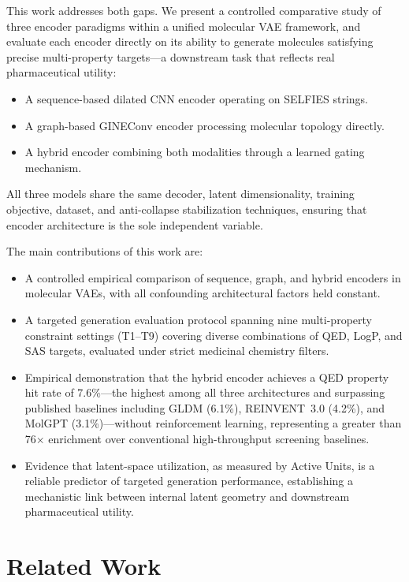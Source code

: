 \documentclass[conference]{IEEEtran}
\begin{document}
This work addresses both gaps. We present a controlled comparative study of three encoder paradigms within a unified molecular VAE framework, and evaluate each encoder directly on its ability to generate molecules satisfying precise multi-property targets---a downstream task that reflects real pharmaceutical utility:

\begin{itemize}
    \item A sequence-based dilated CNN encoder operating on SELFIES strings.
    \item A graph-based GINEConv encoder processing molecular topology directly.
    \item A hybrid encoder combining both modalities through a learned gating mechanism.
\end{itemize}

All three models share the same decoder, latent dimensionality, training objective, dataset, and anti-collapse stabilization techniques, ensuring that encoder architecture is the sole independent variable.

The main contributions of this work are:

\begin{itemize}
    \item A controlled empirical comparison of sequence, graph, and hybrid encoders in molecular VAEs, with all confounding architectural factors held constant.
    \item A targeted generation evaluation protocol spanning nine multi-property constraint settings (T1--T9) covering diverse combinations of QED, LogP, and SAS targets, evaluated under strict medicinal chemistry filters.
    \item Empirical demonstration that the hybrid encoder achieves a QED property hit rate of 7.6\%---the highest among all three architectures and surpassing published baselines including GLDM (6.1\%), REINVENT~3.0 (4.2\%), and MolGPT (3.1\%)---without reinforcement learning, representing a greater than 76$\times$ enrichment over conventional high-throughput screening baselines.
    \item Evidence that latent-space utilization, as measured by Active Units, is a reliable predictor of targeted generation performance, establishing a mechanistic link between internal latent geometry and downstream pharmaceutical utility.
\end{itemize}

\section{Related Work}
\end{document}
